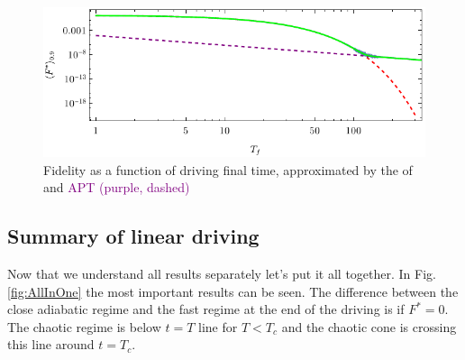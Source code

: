 \begin{figure}[H]
    \centering 
    \includegraphics[scale=1.2]{../img/landauCompare.pdf}
    \caption{Fidelity as a function of driving final time, approximated by the  of  and \textcolor{purple}{APT (purple, dashed)}}
    \label{fig:landauCompare}
\end{figure}

\subsection{Summary of linear driving}
Now that we understand all results separately let's put it all together. In Fig. \ref{fig:AllInOne} the most important results can be seen. The difference between the close adiabatic regime and the fast regime at the end of the driving is if $F^*=0$. The chaotic regime is below $t=T$ line for $T<T_c$ and the chaotic cone is crossing this line around $t=T_c$.


